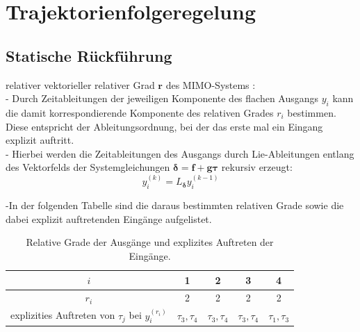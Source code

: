 \section{Trajektorienfolgeregelung}

\subsection{Statische Rückführung}
relativer vektorieller relativer Grad $\pmb{r}$ des MIMO-Systems \cite[S. 194]{NLRT_Roebenack}:\\
- Durch Zeitableitungen der jeweiligen Komponente des flachen Ausgangs $y_i$ kann die damit korrespondierende Komponente des relativen Grades $r_i$ bestimmen. Diese entspricht der Ableitungsordnung, bei der das erste mal ein Eingang explizit auftritt.\\
- Hierbei werden die Zeitableitungen des Ausgangs durch Lie-Ableitungen entlang des Vektorfelds der Systemgleichungen $\pmb{\delta} = \pmb{f} + \pmb{g} \pmb{\tau}$ rekursiv erzeugt: 
\begin{equation}
	y_i^{(k)} = L_{\pmb{\delta}} y_i^{(k-1)}
\end{equation}

-In der folgenden Tabelle sind die daraus bestimmten relativen Grade sowie die dabei explizit auftretenden Eingänge aufgelistet.

\begin{table}[htbp]%
	\centering
	\caption{Relative Grade der Ausgänge und explizites Auftreten der Eingänge.}
	\label{tab:relative_degrees}
	\begin{tabular}{c| c c c c} 
		$i$ & 1 & 2 & 3 & 4 \\ 
		\hline
		$r_i$ & 2 & 2 & 2 & 2\\ 
		\hline
		explizities Auftreten von $\tau_j$ bei $y_i^{(r_i)}$ & $\tau_3, \tau_4$ & $\tau_3, \tau_4$ & $\tau_3, \tau_4$ & $\tau_1, \tau_3$ \\ 
	\end{tabular}
\end{table}

